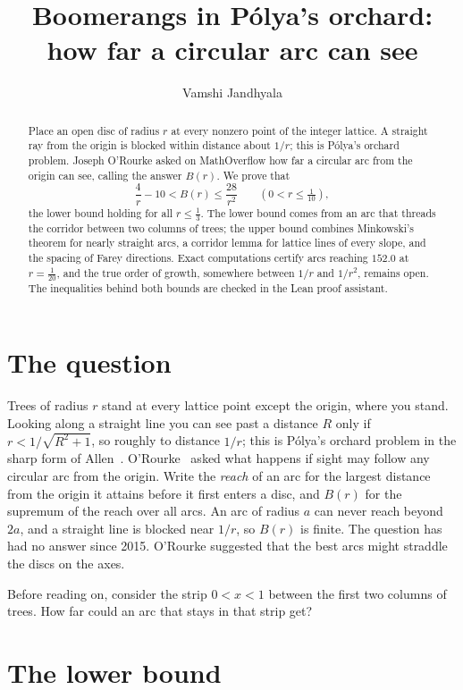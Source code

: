 \documentclass[11pt]{article}
\title{Boomerangs in P\'olya's orchard: \\ how far a circular arc can see}
\author{Vamshi Jandhyala}
\date{}
\begin{document}
\maketitle
\vspace{-2em}

\begin{abstract}
Place an open disc of radius $r$ at every nonzero point of the integer lattice. A straight ray from the origin is
blocked within distance about $1/r$; this is P\'olya's orchard problem. Joseph O'Rourke asked on MathOverflow how far
a circular arc from the origin can see, calling the answer $B(r)$. We prove that
\[
\frac4r-10<B(r)\le\frac{28}{r^2}\qquad(0<r\le\tfrac1{10}),
\]
the lower bound holding for all $r\le\frac13$. The lower bound comes from an arc that threads the corridor between
two columns of trees; the upper bound combines Minkowski's theorem for nearly straight arcs, a corridor lemma for
lattice lines of every slope, and the spacing of Farey directions. Exact computations certify arcs reaching
$152.0$ at $r=\frac1{20}$, and the true order of growth, somewhere between $1/r$ and $1/r^2$, remains open. The
inequalities behind both bounds are checked in the Lean proof assistant.
\end{abstract}

\section{The question}

Trees of radius $r$ stand at every lattice point except the origin, where you stand. Looking along a straight line you
can see past a distance $R$ only if $r<1/\sqrt{R^2+1}$, so roughly to distance $1/r$; this is P\'olya's orchard
problem in the sharp form of Allen~\cite{Allen}. O'Rourke~\cite{MO} asked what happens if sight may follow any
circular arc from the origin. Write the \emph{reach} of an arc for the largest distance from the origin it attains
before it first enters a disc, and $B(r)$ for the supremum of the reach over all arcs. An arc of radius $a$ can never
reach beyond $2a$, and a straight line is blocked near $1/r$, so $B(r)$ is finite. The question has had no
answer since 2015. O'Rourke suggested that the best arcs might straddle the discs on the axes.

Before reading on, consider the strip $0<x<1$ between the first two columns of trees. How far could an arc that stays
in that strip get?

\section{The lower bound}
\end{document}
